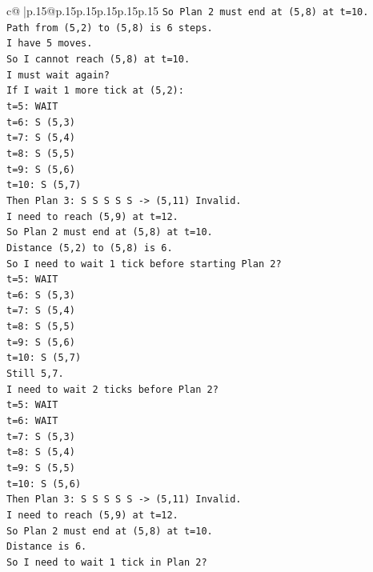 \documentclass{article}
\begin{document}
{\begin{supertabular}{c@{$\;$}|p{.15\linewidth}@{}p{.15\linewidth}p{.15\linewidth}p{.15\linewidth}p{.15\linewidth}p{.15\linewidth}}
{{{\texttt{So Plan 2 must end at (5,8) at t=10.} \\
\texttt{Path from (5,2) to (5,8) is 6 steps.} \\
\texttt{I have 5 moves.} \\
\texttt{So I cannot reach (5,8) at t=10.} \\
\texttt{I must wait again?} \\
\texttt{If I wait 1 more tick at (5,2):} \\
\texttt{t=5: WAIT} \\
\texttt{t=6: S (5,3)} \\
\texttt{t=7: S (5,4)} \\
\texttt{t=8: S (5,5)} \\
\texttt{t=9: S (5,6)} \\
\texttt{t=10: S (5,7)} \\
\texttt{Then Plan 3: S S S S S {-}> (5,11) Invalid.} \\
\texttt{I need to reach (5,9) at t=12.} \\
\texttt{So Plan 2 must end at (5,8) at t=10.} \\
\texttt{Distance (5,2) to (5,8) is 6.} \\
\texttt{So I need to wait 1 tick before starting Plan 2?} \\
\texttt{t=5: WAIT} \\
\texttt{t=6: S (5,3)} \\
\texttt{t=7: S (5,4)} \\
\texttt{t=8: S (5,5)} \\
\texttt{t=9: S (5,6)} \\
\texttt{t=10: S (5,7)} \\
\texttt{Still 5,7.} \\
\texttt{I need to wait 2 ticks before Plan 2?} \\
\texttt{t=5: WAIT} \\
\texttt{t=6: WAIT} \\
\texttt{t=7: S (5,3)} \\
\texttt{t=8: S (5,4)} \\
\texttt{t=9: S (5,5)} \\
\texttt{t=10: S (5,6)} \\
\texttt{Then Plan 3: S S S S S {-}> (5,11) Invalid.} \\
\texttt{I need to reach (5,9) at t=12.} \\
\texttt{So Plan 2 must end at (5,8) at t=10.} \\
\texttt{Distance is 6.} \\
\texttt{So I need to wait 1 tick in Plan 2?} \\
}}}
\end{supertabular}}
\end{document}
